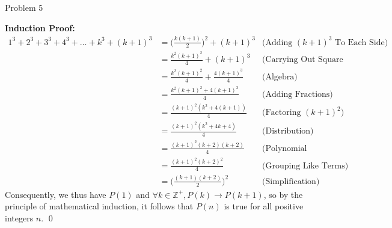 \begin{problem}{Problem 5}
\begin{Highlight}[Solution]
        \noindent \textbf{Induction Proof:}
        \footnotesize{
            \begin{align*}
                1^{3} + 2^{3} + 3^{3} + 4^{3} + \dots + k^{3} + (k + 1)^{3} & = \Big(\frac{k(k + 1)}{2}\Big)^{2} + (k + 1)^{3} & \text{(Adding $(k + 1)^{3}$ To Each Side)} \\
                & = \frac{k^{2}(k + 1)^{2}}{4} + (k + 1)^{3} & \text{(Carrying Out Square Of First Term)} \\
                & = \frac{k^{2}(k + 1)^{2}}{4} + \frac{4(k + 1)^{3}}{4} & \text{(Algebra)} \\
                & = \frac{k^{2}(k + 1)^{2} + 4(k + 1)^{3}}{4} & \text{(Adding Fractions)} \\
                & = \frac{(k + 1)^{2}(k^{2} + 4(k + 1))}{4} & \text{(Factoring $(k + 1)^{2}$)} \\
                & = \frac{(k + 1)^{2}(k^{2} + 4k + 4)}{4} & \text{(Distribution)} \\
                & = \frac{(k + 1)^{2}(k + 2)(k + 2)}{4} & \text{(Polynomial Factorization)} \\
                & = \frac{(k + 1)^{2}(k + 2)^{2}}{4} & \text{(Grouping Like Terms)} \\
                & = \Big(\frac{(k + 1)(k + 2)}{2}\Big)^{2} & \text{(Simplification)}
            \end{align*}
        }
        \normalsize
        Consequently, we thus have $P(1)$ and $\forall k \in \mathbb{Z}^{+}, P(k) \rightarrow P(k + 1)$, so by the principle of mathematical induction, it follows that $P(n)$ is true for all positive
        integers $n$. \qed
    \end{Highlight}
\end{problem}

